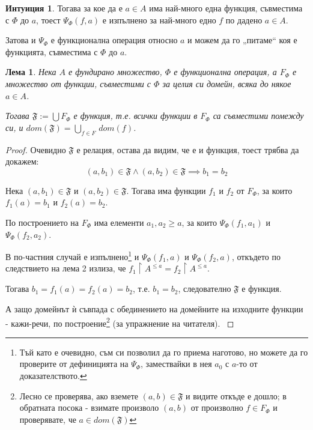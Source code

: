 \documentclass{article}
\newtheorem{lemma}[tlemma]{Лема}
\theoremstyle{definition}
\newtheorem{intuit}{Интуиция}
\begin{document}
\begin{multicols}{2}
{\begin{intuit}
        Тогава за кое да е $a\!\in\!A$ има най-много една функция, съвместима с $\Phi$ до $a$,
        тоест $\Psi_\Phi(f, a)$ е изпълнено за най-много едно $f$ по дадено $a \in A$.

        Затова и $\Psi_\Phi$ е функционална операция относно $a$ и можем да го „питаме“ коя е функцията, съвместима с $\Phi$ до $a$.
    \end{intuit}
}
\begin{lemma}
    Нека $A$ е фундирано множество, %
    $\Phi$ е функционална операция,
    а $F_\Phi$ е множество от функции, съвместими с $\Phi$ за целия си домейн, всяка до някое $a \in A$.

    Тогава $\mathfrak{F} := \bigcup F_\Phi$ е функция, т.е. всички функции в $F_\Phi$ са съвместими помежду си, и $dom(\mathfrak{F}) = \bigcup \limits_{f\in F}\,dom(f)$.
\end{lemma}

\begin{proof}
    Очевидно $\mathfrak{F}$ е релация, остава да видим, че е и функция, тоест трябва да докажем:
    \[{(a,b_1) \in \mathfrak{F} \land (a,b_2) \in \mathfrak{F} \implies b_1=b_2}\]

    Нека $(a,b_1) \in \mathfrak{F}$ и $(a,b_2) \in \mathfrak{F}$.
    Тогава има функции $f_1$ и $f_2$ от $F_\Phi$, за които $f_1(a) = b_1$ и $f_2(a) = b_2$.

    По построението на $F_\Phi$ има елементи ${a_1, a_2 \ge a}$, за които $\Psi_\Phi(f_1, a_1)$ и $\Psi_\Phi(f_2, a_2)$.

    В по-частния случай е изпълнено\footnote{Тъй като е очевидно, съм си позволил да го приема наготово, но можете да го проверите от дефиницията на $\Psi_\Phi$, замествайки в нея $a_0$ с $a$-то от доказателството.} и $\Psi_\Phi(f_1, a)$ и $\Psi_\Phi(f_2, a)$,
    откъдето по следствието на лема 2\linebreak
    излиза, че $f_1 \upharpoonright A^{\le a}=f_2 \upharpoonright A^{\le a}$.

    Тогава $b_1=f_1(a)=f_2(a)=b_2$, т.е. $b_1=b_2$, следователно $\mathfrak{F}$  е функция.

    {
        \small
        А защо домейнът ѝ съвпада с обединението на домейните на изходните функции - кажи-речи, по построение\footnote{Лесно се проверява, ако вземете $(a,b)\in \mathfrak{F}$ и видите откъде е дошло; в обратната посока - взимате произволо $(a,b)$ от произволно $f\in F_\Phi$ и проверявате, че $a \in dom(\mathfrak{F})$}
        (за упражнение на читателя).
    }
\end{proof}


\end{multicols}
\end{document}
